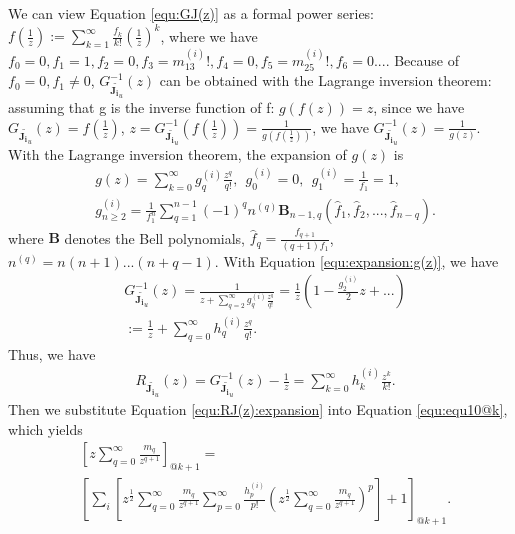 \documentclass[10pt,journal,compsoc]{IEEEtran}
\begin{document}
We can view Equation \eqref{equ:GJ(z)} as a formal power series: $f(\frac{1}{z}):=\sum_{k=1}^{\infty} \frac{f_k}{k!}(\frac{1}{z})^k$, where we have $f_0=0,f_1=1,f_2=0,f_3=m^{(i)}_13!,f_4=0,f_5=m^{(i)}_25!, f_6=0...$. Because of $f_0=0,f_1\ne 0$, $G^{-1}_{\widetilde{\mathbf{J_i}_u}}(z)$ can be obtained with the Lagrange inversion theorem: assuming that g is the inverse function of f: $g(f(z))=z$, since we have  $G_{\widetilde{\mathbf{J_i}_u}}(z)=f(\frac{1}{z})$, $z = G^{-1}_{\widetilde{\mathbf{J_i}_u}}(f(\frac{1}{z}))=\frac{1}{g(f(\frac{1}{z}))}$, we have $G^{-1}_{\widetilde{\mathbf{J_i}_u}}(z) = \frac{1}{g(z)}$. With the Lagrange inversion theorem, the expansion of $g(z)$ is
\begin{equation}
    \begin{split}
        & g(z) = \sum_{k=0}^\infty g^{(i)}_q\frac{z^q}{q!},~~g^{(i)}_0=0,~~ g^{(i)}_1=\frac{1}{f_1}=1,\\
        & g^{(i)}_{n\ge2}=\frac{1}{f_1^n}\sum_{q=1}^{n-1}(-1)^qn^{(q)}\mathbf{B}_{n-1,q}(\hat{f}_1,\hat{f}_2,...,\hat{f}_{n-q}).
    \end{split}
\label{equ:expansion:g(z)}
\end{equation}
where $\mathbf{B}$ denotes the Bell polynomials, $\hat{f}_q = \frac{f_{q+1}}{(q+1)f_1}$, $n^{(q)}=n(n+1)...(n+q-1)$. With Equation \eqref{equ:expansion:g(z)}, we have
\begin{equation}
\begin{split}
    & G^{-1}_{\widetilde{\mathbf{J_i}_u}}(z) = \frac{1}{z + \sum_{q=2}^{\infty}g^{(i)}_q\frac{z^q}{q!}} = \frac{1}{z}(1 - \frac{g^{(i)}_2}{2}z + ...)\\
    & := \frac{1}{z} + \sum_{q=0}^{\infty}{h^{(i)}_q}\frac{z^q}{q!}.
\end{split}
\end{equation}
Thus, we have
\begin{equation}
\begin{split}
    & R_{\widetilde{\mathbf{J_i}_u}}(z) = G^{-1}_{\widetilde{\mathbf{J_i}_u}}(z)-\frac{1}{z} = \sum_{k=0}^{\infty}{h^{(i)}_k}\frac{z^k}{k!}.
\end{split}
\label{equ:RJ(z):expansion}
\end{equation}
Then we substitute Equation \eqref{equ:RJ(z):expansion} into Equation \eqref{equ:equ10@k}, which yields
\begin{equation}
\begin{split}
    & \left[z\sum_{q=0}^{\infty}\frac{m_q}{z^{q+1}}\right]_{@k+1} =\\
    & \left[\sum_i\left[z^{\frac{1}{2}}\sum_{q=0}^{\infty}\frac{m_q}{z^{q+1}}\sum_{p=0}^{\infty}\frac{h^{(i)}_p}{p!}\left(z^{\frac{1}{2}}\sum_{q=0}^{\infty}\frac{m_q}{z^{q+1}}\right)^p\right] + 1\right]_{@k+1}.
\end{split}
\end{equation}
\end{document}
